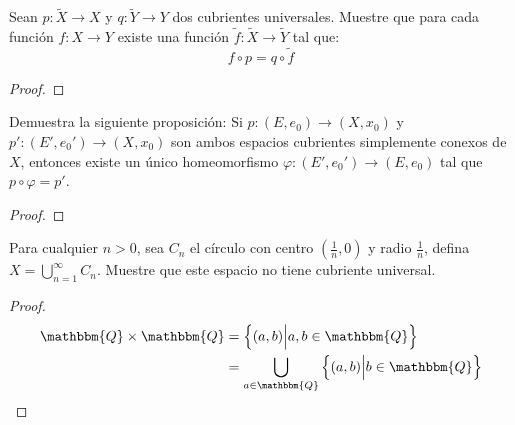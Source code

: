 \documentclass[12pt]{report}
\newcounter{it}
\theoremstyle{largebreak}
\newcommand\cf[3]{\ensuremath{#1:#2\rightarrow#3}}
\newcommand{\bbm}[1]{\ensuremath{\mathbbm{#1}}}
\begin{document}
    \begin{excer}
        Sean $\cf{p}{\widetilde{X}}{X}$ y $\cf{q}{\widetilde{Y}}{Y}$ dos cubrientes universales. Muestre que para cada función $\cf{f}{X}{Y}$ existe una función $\cf{\widetilde{f}}{\widetilde{X}}{\widetilde{Y}}$ tal que:
        \begin{equation*}
            f\circ p=q\circ\widetilde{f}
        \end{equation*}
    \end{excer}

    \begin{proof}
        
    \end{proof}

    \begin{excer}
        Demuestra la siguiente proposición: Si $\cf{p}{(E,e_0)}{(X,x_0)}$ y $\cf{p'}{(E',e_0')}{(X,x_0)}$ son ambos espacios cubrientes simplemente conexos de $X$, entonces existe un único homeomorfismo $\cf{\varphi}{(E',e_0')}{(E,e_0)}$ tal que $p\circ\varphi=p'$.
    \end{excer}

    \begin{proof}
        
    \end{proof}

    \begin{excer}
        Para cualquier $n>0$, sea $C_n$ el círculo con centro $\left(\frac{1}{n},0\right)$ y radio $\frac{1}{n}$, defina $X=\bigcup_{ n=1}^\infty C_n$. Muestre que este espacio no tiene cubriente universal.
    \end{excer}

    \begin{proof}
        \begin{equation}
            \begin{split}
                \bbm{Q}\times\bbm{Q}&=\left\{(a,b)\Big|a,b\in\bbm{Q} \right\}\\
                &=\bigcup_{ a\in\bbm{Q}}\left\{(a,b)\Big|b\in\bbm{Q} \right\}
            \end{split}
        \end{equation}
    \end{proof}
\end{document}
